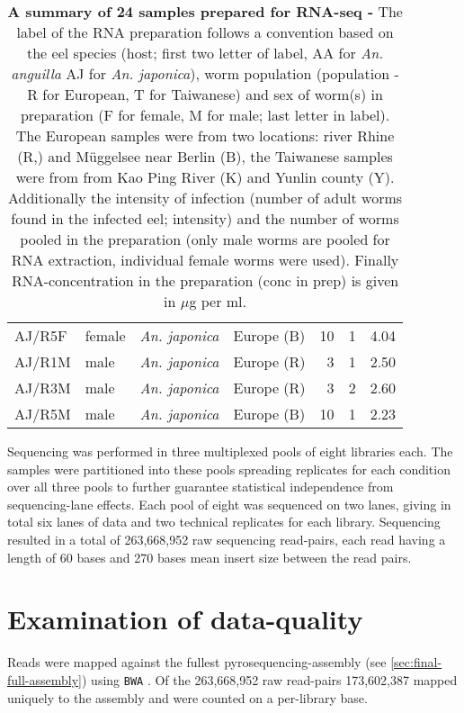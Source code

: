 \begin{table}[h]
\begin{center}
\begin{tabular}{llllrrr}
  AJ/R5F & female & \textit{An. japonica} & Europe (B) & 10 & 1 & 4.04 \\ 
  AJ/R1M & male & \textit{An. japonica} & Europe (R) & 3 & 1 & 2.50 \\ 
  AJ/R3M & male & \textit{An. japonica} & Europe (R) & 3 & 2 & 2.60 \\ 
  AJ/R5M & male & \textit{An. japonica} & Europe (B) & 10 & 1 & 2.23 \\ 
  \hline
\end{tabular}
\caption[Summary of RNA preparation]{\textbf{A summary of 24 samples
    prepared for RNA-seq -} The label of the RNA preparation follows a
  convention based on the eel species (host; first two letter of
  label, AA for \textit{An. anguilla} AJ for \textit{An. japonica}),
  worm population (population - R for European, T for Taiwanese) and
  sex of worm(s) in preparation (F for female, M for male; last letter
  in label). The European samples were from two locations: river Rhine
  (R,) and M\"uggelsee near Berlin (B), the Taiwanese samples were from
  from Kao Ping River (K) and Yunlin county (Y). Additionally the
  intensity of infection (number of adult worms found in the infected
  eel; intensity) and the number of worms pooled in the preparation
  (only male worms are pooled for RNA extraction, individual female
  worms were used). Finally RNA-concentration in the preparation (conc
  in prep) is given in $\mu$g per ml.}
\label{tab:lib-prep}
\end{center}
\end{table}


Sequencing was performed in three multiplexed pools of eight libraries
each. The samples were partitioned into these pools spreading
replicates for each condition over all three pools to further
guarantee statistical independence from sequencing-lane effects. Each
pool of eight was sequenced on two lanes, giving in total six lanes of
data and two technical replicates for each library. Sequencing
resulted in a total of 263,668,952 raw sequencing read-pairs, each
read having a length of 60 bases and 270 bases mean insert size
between the read pairs.

\section{Examination of data-quality}

Reads were mapped against the fullest pyrosequencing-assembly (see
\ref{sec:final-full-assembly}) using \texttt{BWA}
\cite{pmid20080505}. Of the 263,668,952 raw read-pairs 173,602,387
mapped uniquely to the assembly and were counted on a per-library
base. 

